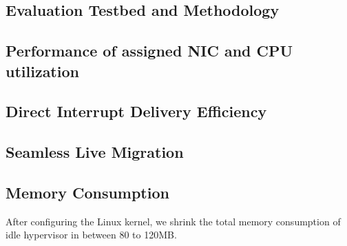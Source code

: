 \subsection{Evaluation Testbed and Methodology}


\subsection{Performance of assigned NIC and CPU utilization}


\subsection{Direct Interrupt Delivery Efficiency}


\subsection{Seamless Live Migration}


\subsection{Memory Consumption}
After configuring the Linux kernel, we shrink the total memory
consumption of idle hypervisor in between 80 to 120MB.
